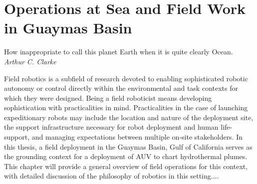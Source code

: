 \chapter{Operations at Sea and Field Work in Guaymas Basin}
\label{chap:opsatsea}

\begin{center}
    \begin{minipage}{0.7\textwidth}
      \begin{small}
        How inappropriate to call this planet Earth when it is quite clearly Ocean.\\ \emph{Arthur C. Clarke}
      \end{small}
    \end{minipage}
    \vspace{0.5cm}
\end{center}

Field robotics is a subfield of research devoted to enabling sophisticated robotic autonomy or control directly within the environmental and task contexts for which they were designed.
Being a field roboticist means developing sophistication with practicalities in mind.
Practicalities in the case of launching expeditionary robots may include the location and nature of the deployment site, the support infrastructure necessary for robot deployment and human life-support, and managing expectations between multiple on-site stakeholders.
In this thesis, a field deployment in the Guaymas Basin, Gulf of California serves as the grounding context for a deployment of AUV \Sentry to chart hydrothermal plumes.
This chapter will provide a general overview of field operations for this context, with detailed discussion of the philosophy of robotics in this setting....

